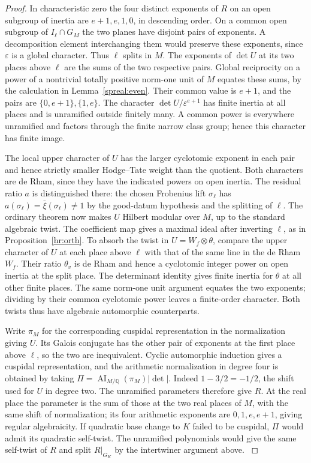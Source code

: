 \begin{proof}
In characteristic zero the four distinct exponents of \(R\) on
an open subgroup of inertia are \(e+1,e,1,0\), in descending
order. On a common open subgroup of \(I_\ell\cap G_M\) the two
planes have disjoint pairs of exponents. A decomposition element
interchanging them would preserve these exponents, since
\(\varepsilon\) is a global character. Thus \(\ell\) splits in
\(M\). The exponents of \(\det U\) at its two places above \(\ell\)
are the sums of the two respective pairs. Global reciprocity on a
power of a nontrivial totally positive norm-one unit of \(M\)
equates these sums, by the calculation in Lemma~\ref{spreal:even}.
Their common value is \(e+1\), and the pairs are
\(\{0,e+1\},\{1,e\}\). The character \(\det U/\varepsilon^{e+1}\)
has finite inertia at all places and is unramified outside finitely
many. A common power is everywhere unramified and factors through
the finite narrow class group; hence this character has finite
image.

The local upper character of \(U\) has the larger cyclotomic
exponent in each pair and hence strictly smaller Hodge--Tate
weight than the quotient. Both characters are de Rham, since
they have the indicated powers on open inertia. The residual
ratio \(a\) is distinguished there: the chosen Frobenius lift
\(\sigma_\ell\) has \(a(\sigma_\ell)=\bar\xi(\sigma_\ell)\ne1\)
by the good-datum hypothesis and the splitting of \(\ell\).
The ordinary theorem now makes \(U\) Hilbert modular over \(M\),
up to the standard algebraic twist. The coefficient map gives a
maximal ideal after inverting \(\ell\), as in
Proposition~\ref{hr:orth}. To absorb the twist in \(U=W_f\otimes\theta\),
compare the upper character of \(U\) at each place above \(\ell\)
with that of the same line in the de Rham \(W_f\). Their ratio
\(\theta_v\) is de Rham and hence a cyclotomic integer power on
open inertia at the split place. The determinant identity gives
finite inertia for \(\theta\) at all other finite places.
The same norm-one unit argument equates the two exponents; dividing
by their common cyclotomic power leaves a finite-order character.
Both twists thus have algebraic automorphic counterparts.
\cite[Theorem~5.1.1(2)]{panFM}

Write \(\pi_M\) for the corresponding cuspidal representation in
the normalization giving \(U\). Its Galois conjugate has the other
pair of exponents at the first place above \(\ell\), so the two
are inequivalent. Cyclic automorphic induction gives a cuspidal
representation, and the arithmetic normalization in degree four
is obtained by taking
\(\Pi=\operatorname{AI}_{M/\mathbb Q}(\pi_M)|\det|\).
Indeed \(1-3/2=-1/2\), the shift used for \(U\) in degree two.
The unramified parameters therefore give \(R\). At the real place
the parameter is the sum of those at the two real places of
\(M\), with the same shift of normalization; its four arithmetic
exponents are \(0,1,e,e+1\), giving regular algebraicity.
If quadratic base change to \(K\) failed to be cuspidal,
\(\Pi\) would admit its quadratic self-twist. The unramified
polynomials would give the same self-twist of \(R\) and split
\(R|_{G_K}\) by the intertwiner argument above.
\cite[Chapter~III, Theorems~4.2, 5.1 and~6.2, Corollary~6.5]{arthurClozelBC}
\end{proof}

